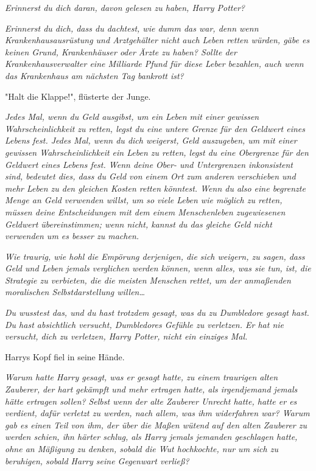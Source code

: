 {\emph{Erinnerst du dich daran, davon gelesen zu haben, Harry Potter?}

\emph{Erinnerst du dich, dass du dachtest, wie dumm das war, denn wenn Krankenhausausrüstung und Arztgehälter nicht auch Leben retten würden, gäbe es keinen Grund, Krankenhäuser oder Ärzte zu haben? Sollte der Krankenhausverwalter eine Milliarde Pfund für diese Leber bezahlen, auch wenn das Krankenhaus am nächsten Tag bankrott ist?}

"Halt die Klappe!", flüsterte der Junge.

\emph{Jedes Mal, wenn du Geld ausgibst, um ein Leben mit einer gewissen Wahrscheinlichkeit zu retten, legst du eine untere Grenze für den Geldwert eines Lebens fest. Jedes Mal, wenn du dich weigerst, Geld auszugeben, um mit einer gewissen Wahrscheinlichkeit ein Leben zu retten, legst du eine Obergrenze für den Geldwert eines Lebens fest. Wenn deine Ober- und Untergrenzen inkonsistent sind, bedeutet dies, dass du Geld von einem Ort zum anderen verschieben und mehr Leben zu den gleichen Kosten retten könntest. Wenn du also eine begrenzte Menge an Geld verwenden willst, um so viele Leben wie möglich zu retten, müssen deine Entscheidungen mit dem einem Menschenleben zugewiesenen Geldwert übereinstimmen; wenn nicht, kannst du das gleiche Geld nicht verwenden um es besser zu machen.}

\emph{Wie traurig, wie hohl die Empörung derjenigen, die sich weigern, zu sagen, dass Geld und Leben jemals verglichen werden können, wenn alles, was sie tun, ist, die Strategie zu verbieten, die die meisten Menschen rettet, um der anmaßenden moralischen Selbstdarstellung willen…}

\emph{Du wusstest das, und du hast trotzdem gesagt, was du zu Dumbledore gesagt hast. Du hast absichtlich versucht, Dumbledores Gefühle zu verletzen. Er hat nie versucht, dich zu verletzen, Harry Potter, nicht ein einziges Mal.}

Harrys Kopf fiel in seine Hände.

\emph{Warum hatte Harry gesagt, was er gesagt hatte, zu einem traurigen alten Zauberer,} \emph{der hart gekämpft und mehr ertragen hatte, als irgendjemand jemals hätte ertragen sollen?} \emph{Selbst wenn der alte Zauberer Unrecht hatte, hatte er es verdient, dafür verletzt zu werden, nach allem, was ihm widerfahren war? Warum gab es einen Teil von ihm, der über die Maßen wütend auf den alten Zauberer zu werden schien, ihn härter schlug, als Harry jemals jemanden geschlagen hatte, ohne an Mäßigung zu denken, sobald die Wut hochkochte, nur um sich zu beruhigen, sobald Harry seine Gegenwart verließ?}

}
